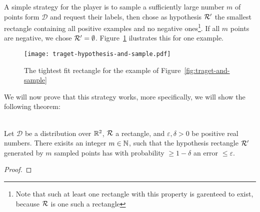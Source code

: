     A simple strategy for the player is to sample a sufficiently large number \(m\) of points form \(\mathcal{D}\) and request their labels, then chose as hypothesis \(\mathcal{R}^\prime\) the smallest rectangle containing all positive examples and no negative ones\footnote{Note that such at least one rectangle with this property is garenteed to exist, because \(\mathcal{R}\) is one such a rectangle}. If all \(m\) points are negative, we chose \(\mathcal{R}^\prime = \emptyset\). Figure~\ref{fig:traget-hypothesis-and-sample} ilustrates this for one example.

    \begin{figure}
        \begin{center}
            \texttt{[image: traget-hypothesis-and-sample.pdf]}
        \end{center}
        \caption{The tightest fit rectangle for the example of Figure~\ref{fig:traget-and-sample}}
        \label{fig:traget-hypothesis-and-sample}
    \end{figure}

    We will now prove that this strategy works, more specifically, we will show the following theorem:

    \begin{theorem}
        \ \\
        Let \(\mathcal{D}\) be a distribution over \(\mathbb{R}^2\), \(\mathcal{R}\) a rectangle, and \(\varepsilon, \delta>0\) be positive real numbers.
        There exisits an integer \(m\in\mathbb{N}\), such that the hypothesis rectangle \(\mathcal{R}^\prime\) generated by \(m\) sampled points has with probability \(\ge 1 - \delta\) an error \(\le\varepsilon\).
    \end{theorem}

    \begin{proof}
        
    \end{proof}